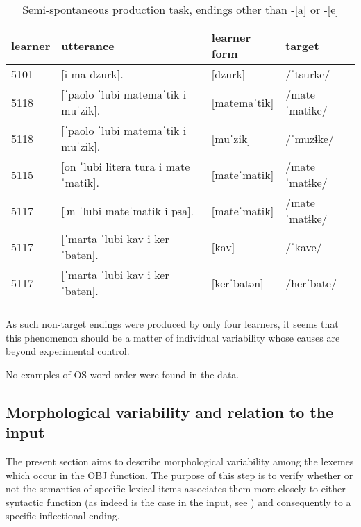 \begin{table}
    \begin{tabularx}{\textwidth}{llll}
        \lsptoprule
        learner & utterance & learner form & target\\
        \midrule
        5101 & [i ma dzurk]. & [dzurk] & /ˈtsurke/\\
        5118 & [ˈpaolo ˈlubi matemaˈtik i muˈzik]. & [matemaˈtik] & /mateˈmatɨke/\\
        5118 & [ˈpaolo ˈlubi matemaˈtik i muˈzik]. & [muˈzik] & /ˈmuzɨke/\\
        5115 & [on ˈlubi literaˈtura i mateˈmatik]. & [mateˈmatik] & /mateˈmatɨke/\\
        5117 & [ɔn ˈlubi mateˈmatik i psa]. & [mateˈmatik] & /mateˈmatɨke/\\
        5117 & [ˈmarta ˈlubi kav i kerˈbatən]. & [kav] & /ˈkave/\\
        5117 & [ˈmarta ˈlubi kav i kerˈbatən]. & [kerˈbatən] & /herˈbate/\\
        \lspbottomrule
    \end{tabularx}
    \caption{Semi-spontaneous production task, endings other than -[a] or -[e]}
    \label{tab:07:1}
\end{table}

As such non-target endings were produced by only four learners, it seems that this phenomenon should be a matter of individual variability whose causes are beyond experimental control. 

No examples of OS word order were found in the data. 

\subsection{Morphological variability and relation to the input}\label{sec:07:2.1}

The present section aims to describe morphological variability among the lexemes which occur in the OBJ function. The purpose of this step is to verify whether or not the semantics of specific lexical items associates them more closely to either syntactic function (as indeed is the case in the input, see ) and consequently to a specific inflectional ending.

